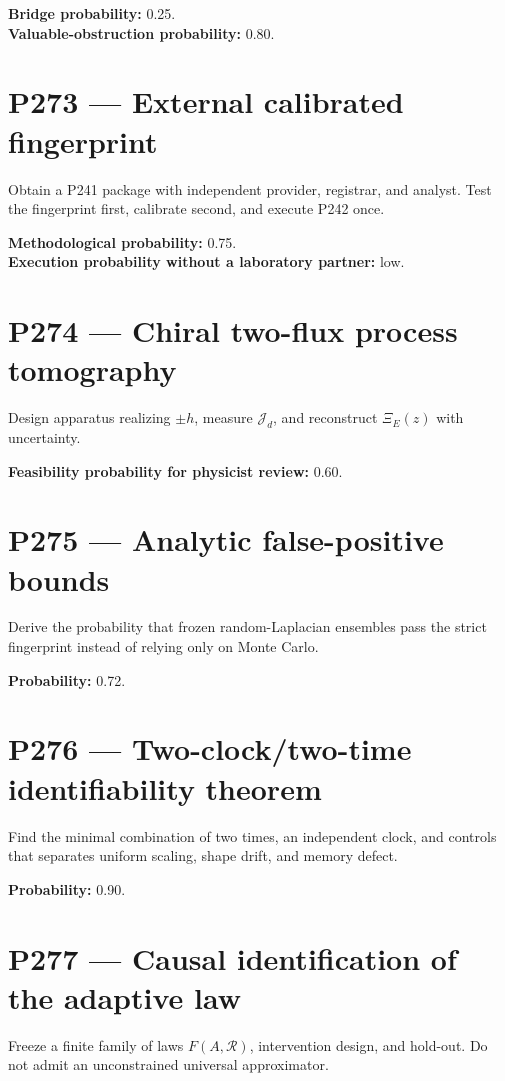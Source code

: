 \documentclass[11pt,a4paper,openany]{report}
\begin{document}
\textbf{Bridge probability:} 0.25.\\
\textbf{Valuable-obstruction probability:} 0.80.

\section{P273 --- External calibrated fingerprint}

Obtain a P241 package with independent provider, registrar, and analyst. Test the fingerprint first, calibrate second, and execute P242 once.

\textbf{Methodological probability:} 0.75.\\
\textbf{Execution probability without a laboratory partner:} low.

\section{P274 --- Chiral two-flux process tomography}

Design apparatus realizing \(\pm h\), measure \(\mathcal J_d\), and reconstruct \(\Xi_E(z)\) with uncertainty.

\textbf{Feasibility probability for physicist review:} 0.60.

\section{P275 --- Analytic false-positive bounds}

Derive the probability that frozen random-Laplacian ensembles pass the strict fingerprint instead of relying only on Monte Carlo.

\textbf{Probability:} 0.72.

\section{P276 --- Two-clock/\allowbreak{}two-time identifiability theorem}

Find the minimal combination of two times, an independent clock, and controls that separates uniform scaling, shape drift, and memory defect.

\textbf{Probability:} 0.90.

\section{P277 --- Causal identification of the adaptive law}

Freeze a finite family of laws \(F(A,\mathcal R)\), intervention design, and hold-out. Do not admit an unconstrained universal approximator.
\end{document}
